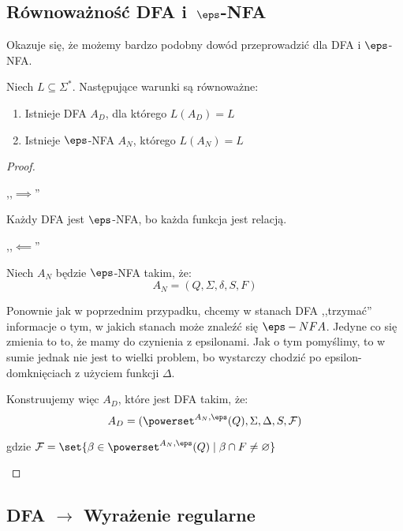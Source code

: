 \subsection{Równoważność DFA i~\texorpdfstring{\(\eps\)}{epsilon}-NFA}

Okazuje się, że możemy bardzo podobny dowód przeprowadzić dla DFA i \( \eps\)-NFA. 

\begin{theorem}
    Niech \( L \subseteq \Sigma^* \).
    Następujące warunki są równoważne:
    \begin{enumerate}
            \item Istnieje DFA \( A_D \), dla którego \( L(A_D) = L \)
        \item Istnieje \(\eps\)-NFA \( A_N \), którego \( L(A_N) = L \) 
    \end{enumerate}
\end{theorem}
\begin{proof}
     \begin{description}
        \item ,,\( \implies \)''
        
        Każdy DFA jest \(\eps\)-NFA, bo każda funkcja jest relacją.
            
        \item ,,\( \impliedby \)''
        
        Niech \(A_N\) będzie \(\eps\)-NFA takim, że: 
        \[ A_N = (Q, \Sigma, \delta, S, F) \]
        
        Ponownie jak w poprzednim przypadku, chcemy w stanach DFA ,,trzymać'' informacje o tym, w jakich stanach może znaleźć się \(\eps-NFA\). Jedyne co się zmienia to to, że mamy do czynienia z epsilonami. Jak o tym pomyślimy, to w sumie jednak nie jest to wielki problem, bo wystarczy chodzić po epsilon-domknięciach z użyciem funkcji \( \Delta \). 
        
        Konstruujemy więc \(A_D\), które jest DFA takim, że:
        \[ A_D = (\powerset^{A_N, \eps}(Q), \Sigma, \Delta, S, \mathcal{F})\]
        
        gdzie \( \mathcal{F} = \set{\beta \in \powerset^{A_N, \eps}(Q) \mid \beta \cap F \neq \varnothing} \)
    \end{description}
\end{proof}


\subsection{DFA \texorpdfstring{\( \rightarrow \)}{na} Wyrażenie regularne}

